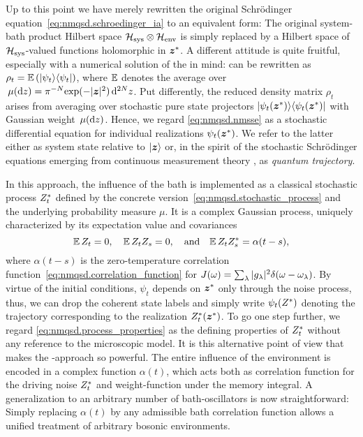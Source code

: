Up to this point we have merely rewritten the original Schrödinger equation~\ref{eq:nmqsd.schroedinger_ia} to an equivalent form:
The original system-bath product Hilbert space $\mathcal{H}_\mathrm{sys} \otimes \mathcal{H}_\mathrm{env}$ is simply replaced by a Hilbert space of $\mathcal{H}_\mathrm{sys}$-valued functions holomorphic in ${\boldsymbol{z}}^*$.
A different attitude is quite fruitful, especially with a numerical solution of the \NMSSE in mind:
 can be rewritten as $\rho_t = \E[\ket{\psi_t}\bra{\psi_t}]$, where $\E$ denotes the average over $\mudz = \pi^{-N} \exp(-\abs{\vec z}^2) \dd^{2N}z$.
Put differently, the reduced density matrix $\rho_t$ arises from averaging over stochastic pure state projectors $\ket{\psitz}\bra{\psitz}$ with Gaussian weight $\, \mu(\mathrm{d} z)$.
Hence, we regard \autoref{eq:nmqsd.nmsse} as a stochastic differential equation for individual realizations $\psi_t({\boldsymbol{z}}^*)$.
We refer to the latter either as system state relative to $| \boldsymbol{z} \rangle$ or, in the spirit of the stochastic Schrödinger equations emerging from continuous measurement theory \cite{Ca93_quantum_optics}, as \emph{quantum trajectory}.

In this approach, the influence of the bath is implemented as a classical stochastic process ${Z}^*_t$ defined by the concrete version~\ref{eq:nmqsd.stochastic_process} and the underlying probability measure $\mu$.
It is a complex Gaussian process, uniquely characterized by its expectation value and covariances
\begin{equation}
  \E\,Z_t = 0, \quad \E\,Z_t Z_s =0, \quad\mbox{and}\quad \E\,Z_t \ZZ_s = \alpha(t-s),
  \label{eq:nmqsd.process_properties}
\end{equation}
where $\alpha(t-s)$ is the zero-temperature correlation function~\ref{eq:nmqsd.correlation_function} for $J(\omega) = \sum_\lambda \vert g_\lambda \vert^2 \delta(\omega - \omega_\lambda)$.
By virtue of the initial conditions, $\psi_t$ depends on ${\boldsymbol{z}}^*$ only through the noise process, thus, we can drop the coherent state labels and simply write $\psitZ$ denoting the trajectory corresponding to the realization ${Z}^*_t({\boldsymbol{z}}^*)$.
To go one step further, we regard \autoref{eq:nmqsd.process_properties} as the defining properties of ${Z}^*_t$ without any reference to the microscopic model.
It is this alternative point of view that makes the \NMSSE-approach so powerful.
The entire influence of the environment is encoded in a complex function $\alpha(t)$, which acts both as correlation function for the driving noise ${Z}^*_t$ and weight-function under the memory integral.
A generalization to an arbitrary number of bath-oscillators is now straightforward: Simply replacing $\alpha(t)$ by any admissible bath correlation function allows a unified treatment of arbitrary bosonic environments.

